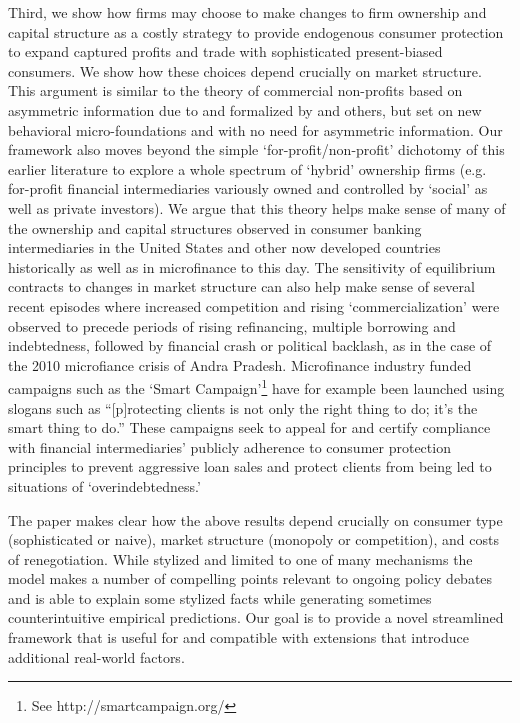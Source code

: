 \documentclass[11pt,english]{article}
\theoremstyle{plain}
\theoremstyle{definition}
\begin{document}
Third, we show how firms may choose to make  changes to firm ownership and capital structure as a costly strategy to provide endogenous consumer protection to expand captured profits and trade with sophisticated present-biased consumers. We show how these
choices depend crucially on market structure. This argument is similar to the theory of commercial non-profits based on asymmetric information due to \citet{hansmann1996} and formalized by \cite{glaeser2001} and others, but set on new behavioral micro-foundations and with no need for asymmetric information.  Our framework also moves beyond the simple `for-profit/non-profit' dichotomy of this earlier literature to explore a whole spectrum of `hybrid' ownership firms (e.g. for-profit financial intermediaries variously owned and controlled by  `social'   as well as private investors).
We argue that this theory helps make sense of many of the ownership and capital structures observed in  consumer banking intermediaries  in the United States and other now developed countries historically as well as in microfinance to this day.  The sensitivity of equilibrium contracts to changes in market structure can also help make sense of several recent episodes where increased competition and rising `commercialization'
were observed to precede periods of rising refinancing, multiple borrowing and indebtedness, followed by financial crash or political backlash, as in the case of the 2010 microfiance crisis of Andra Pradesh.   
 Microfinance industry funded campaigns such as the `Smart Campaign'\footnote{See http://smartcampaign.org/} have for example been launched using slogans such as  ``[p]rotecting clients is not only the right thing to do; it's the smart thing to do.''  These campaigns seek to appeal for and certify compliance with financial intermediaries' publicly adherence to consumer protection principles to  prevent aggressive loan sales and protect clients from being led to situations of `overindebtedness.' 


The paper makes clear how the above results depend crucially on consumer
type (sophisticated or naive), market structure (monopoly or competition),
and costs of renegotiation. While stylized and limited
to one of many mechanisms the model makes a number of
compelling points relevant to ongoing policy debates and is able to
explain some stylized facts while generating sometimes counterintuitive
empirical predictions. Our goal is to provide a novel streamlined
framework that is useful for and compatible with extensions that introduce
additional real-world factors.
\end{document}
